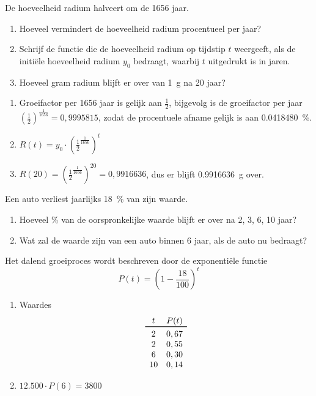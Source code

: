 \begin{oef}
 De hoeveelheid  radium halveert om de  1656 jaar.
    \begin{enumerate}
        \item Hoeveel vermindert de hoeveelheid radium
            procentueel per jaar?
        \item Schrijf de functie  die de hoeveelheid radium op tijdstip
            $t$ weergeeft, als de initi\"ele hoeveelheid radium $y_0$
            bedraagt, waarbij $t$ uitgedrukt is in jaren.
        \item Hoeveel gram radium blijft er over van \SI{1}{\gram} na 20
            jaar?
    \end{enumerate}
\begin{opl}
\begin{enumerate}
  \item Groeifactor per 1656 jaar is gelijk aan $\frac12$, bijgevolg
        is de groeifactor per jaar $\left(\frac{1}{2}\right)^\frac{1}{1656}=0,9995815$,
        zodat de procentuele afname gelijk is aan \SI{0,0418480}{\percent}.
  \item $R(t)=y_0\cdot \left(\frac{1}{2}^\frac{1}{1656}\right)^t$
  \item $R(20)=\left(\frac{1}{2}^\frac{1}{1656}\right)^{20}=0,9916636$, dus er blijft \SI{0.9916636}{\gram} over.
\end{enumerate}
\end{opl}
       \end{oef}


\begin{oef}
Een auto verliest jaarlijks \SI{18}{\percent} van zijn waarde.
\begin{enumerate}
  \item Hoeveel \% van de oorspronkelijke waarde blijft er over na 2, 3, 6, 10 jaar?
  \item Wat zal de waarde zijn van een auto binnen 6 jaar, als de auto nu  bedraagt? 
\end{enumerate}
\begin{opl}
Het dalend groeiproces wordt beschreven door de exponenti\"ele functie
\[
  P(t) = (1 - \frac{18}{100})^t
\]
\begin{enumerate}
  \item Waardes
        \[
          \begin{array}{cc}
            t & P(t) \\
            \toprule
            2 & 0,67 \\
            2 & 0,55 \\
            6 & 0,30 \\
            10 & 0,14 \\
          \end{array}
        \]
  \item $12.500 \cdot P(6) = 3800$
\end{enumerate}
\end{opl}
\end{oef}

